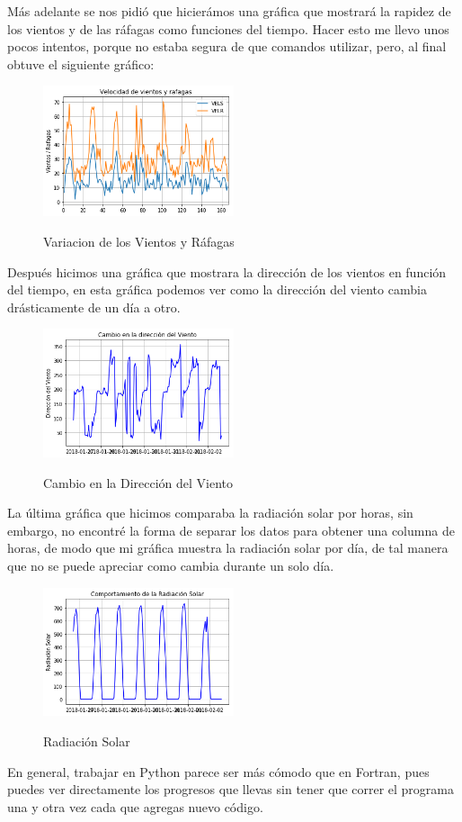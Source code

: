 \documentclass{article}
\begin{document}
Más adelante se nos pidió que hicierámos una gráfica que mostrará la rapidez de los vientos y de las ráfagas como funciones del tiempo.
Hacer esto me llevo unos pocos intentos, porque no estaba segura de que comandos utilizar, pero, al final obtuve el siguiente gráfico:
\begin{figure}[H]
    \caption{Variacion de los Vientos y Ráfagas}
    \includegraphics[width=0.5\textwidth]{Vel vientosYrafagas.png}
    \centering
    \label{VelRag}
\end{figure}
Después hicimos una gráfica que mostrara la dirección de los vientos en función del tiempo, en esta gráfica podemos ver como la dirección del viento cambia drásticamente de un día a otro.
\begin{figure}[H]
    \caption{Cambio en la Dirección del Viento}
    \includegraphics[width=0.5\textwidth]{CambioDirViento.png}
    \centering
    \label{Viento}
\end{figure}

La última gráfica que hicimos comparaba la radiación solar por horas, sin embargo, no encontré la forma de separar los datos para obtener una columna de horas, de modo que mi gráfica muestra la radiación solar por día, de tal manera que no se puede apreciar como cambia durante un solo día.
\begin{figure}[H]
    \caption{Radiación Solar}
    \includegraphics[width=0.5\textwidth]{CompRadiacionSol.png}
    \centering
    \label{RadSol}
\end{figure}
En general, trabajar en Python parece ser más cómodo que en Fortran, pues puedes ver directamente los progresos que llevas sin tener que correr el programa una y otra vez cada que agregas nuevo código.
\end{document}
